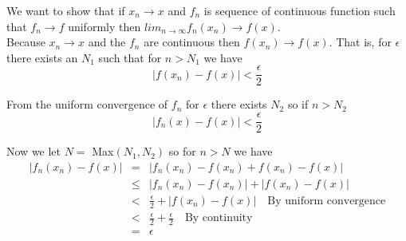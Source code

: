 \documentclass[11pt,reqno]{article}
\begin{document}
We want to show that if $x_n \to x$ and $f_n$ is sequence of continuous function such that $f_n \to f$ uniformly then $lim_{n \to \infty} f_n(x_n) \to f(x)$.\\
Because $x_n \to x$ and the $f_n$ are continuous then $f(x_n) \to f(x)$. That is, for $\epsilon$ there exists an $N_1$ such that for $n > N_1$ we have
\begin{equation}
|f(x_n) - f(x)| < \frac{\epsilon}{2} \nonumber
\end{equation}

\noindent From the uniform convergence of $f_n$ for $\epsilon$ there exists $N_2$ so if $n > N_2$
\begin{equation}
|f_n(x) - f(x)| < \frac{\epsilon}{2} \nonumber
\end{equation}

\noindent Now we let $N = $ Max$(N_1,N_2)$ so for $n > N$ we have 
\begin{eqnarray*} 
|f_n(x_n) - f(x)| &=& |f_n(x_n)-f(x_n) + f(x_n) - f(x)| \\
		        &\le& |f_n(x_n)-f(x_n)| + |f(x_n) - f(x)| \\
		        &<& \frac{\epsilon}{2} + |f(x_n) - f(x)| \quad \text{By uniform convergence}\\
		        &<& \frac{\epsilon}{2} + \frac{\epsilon}{2} \quad \text{By continuity}\\
		        &=& \epsilon
\end{eqnarray*}
\end{document}
